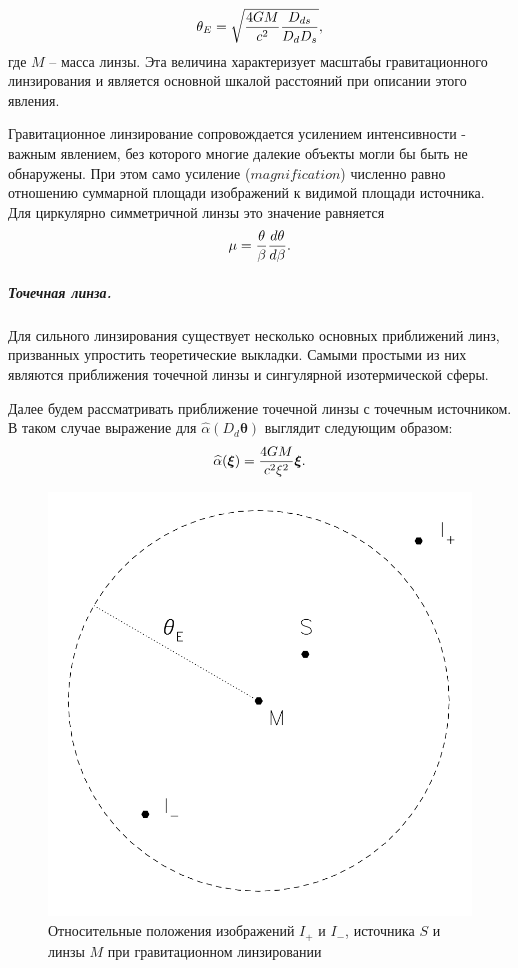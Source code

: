 \documentclass[12pt,a4paper]{article}
\begin{document}
\begin{equation}
    \theta_E = \sqrt{{4 G  M \over c^2  } {D_{ds} \over D_d D_{s}}},
\end{equation}
где $M$ -- масса линзы. Эта величина характеризует масштабы гравитационного линзирования и является основной шкалой расстояний при описании этого явления.

Гравитационное линзирование сопровождается усилением интенсивности - важным явлением, без которого многие далекие объекты могли бы быть не обнаружены.
При этом само усиление ($magnification$) численно равно отношению суммарной площади изображений к видимой площади источника.
Для циркулярно симметричной линзы это значение равняется
\begin{equation}
    \mu = {\theta \over \beta}{ d\theta \over d\beta}.
\end{equation}

\subparagraph*{Точечная линза.}
Для сильного линзирования существует несколько основных приближений линз, призванных упростить теоретические выкладки.
Самыми простыми из них являются приближения точечной линзы и сингулярной изотермической сферы.

Далее будем рассматривать приближение точечной линзы с точечным источником.
В таком случае выражение для $\widehat{\alpha}(D_d \bm \theta)$ выглядит следующим образом:
\begin{equation}
    \widehat{\alpha}(\bm \xi) = {4 G M \over c^2 \xi^2} \bm \xi.
\end{equation}

\begin{figure}
    \centering
    \includegraphics[width=0.8\linewidth]{sources/imagesForm.png}
    \caption{\small Относительные положения изображений $I_+$ и $I_-$, источника $S$ и линзы $M$ при гравитационном линзировании \cite{narayan}}   
\end{figure}
\end{document}
